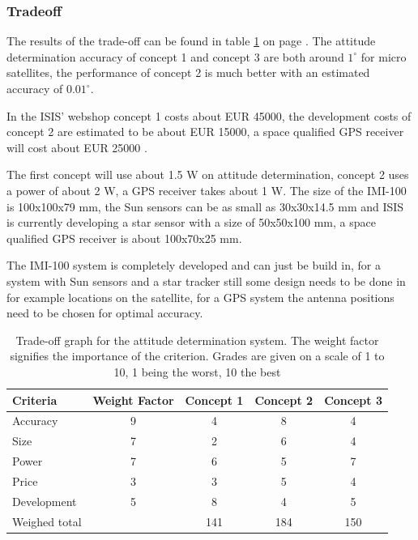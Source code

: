 \subsubsection{Tradeoff}
The results of the trade-off can be found in table \ref{tab:adstradeoff} on page \pageref{tab:adstradeoff}. 
The attitude determination accuracy of concept 1 and concept 3 are both around $1^\circ$ for micro satellites, the performance of concept 2 is much better with an estimated accuracy of $0.01^\circ$.

In the \ac{ISIS}' webshop \cite{cubesatshop} concept 1 costs about EUR 45000, the development costs of concept 2 are estimated to be about EUR 15000, a space qualified \ac{GPS} receiver will cost about EUR 25000 \cite{spacequest}.

The first concept will use about 1.5 W on attitude determination, concept 2 uses a power of about 2 W, a \ac{GPS} receiver takes about 1 W.
The size of the IMI-100 is 100x100x79 mm, the Sun sensors can be as small as 30x30x14.5 mm \cite{tnoweb} and \ac{ISIS} is currently developing a star sensor with a size of 50x50x100 mm, a space qualified \ac{GPS} receiver is about 100x70x25 mm. 

The IMI-100 system is completely developed and can just be build in, for a system with Sun sensors and a star tracker still some design needs to be done in for example locations on the satellite, for a \ac{GPS} system the antenna positions need to be chosen for optimal accuracy.

\begin{table} [h]
\centering
\begin{tabular}{p{3cm} | c | c c c}
\textbf{Criteria} & \textbf{Weight Factor} & \textbf{Concept 1} & \textbf{Concept 2} & \textbf{Concept 3} \\ \hline \hline
Accuracy    & 9 & 4 & 8 & 4\\
Size        & 7 & 2 & 6 & 4\\
Power       & 7 & 6 & 5 & 7\\
Price       & 3 & 3 & 5 & 4\\
Development & 5 & 8 & 4 & 5\\ \hline
Weighed total    &    & 141 & 184 & 150
\end{tabular} 
\caption[Trade-off attitude determination]{Trade-off graph for the attitude determination system. The weight factor signifies the importance of the criterion. Grades are given on a scale of 1 to 10, 1 being the worst, 10 the best}
\label{tab:adstradeoff}
\end{table}

